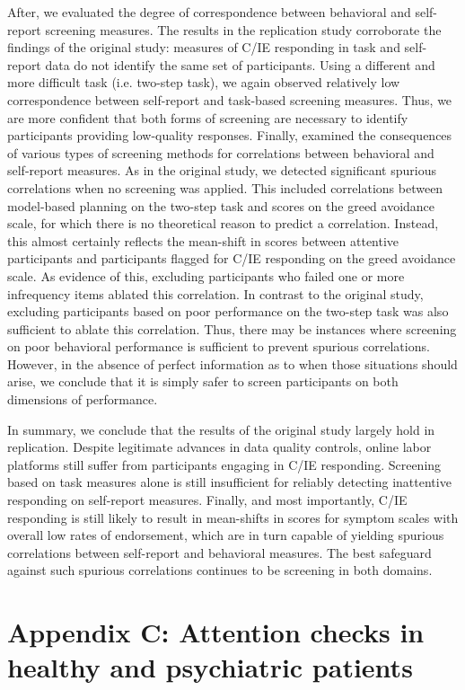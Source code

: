 \documentclass[a4paper,notitlepage,12pt]{article}
\begin{document}
\begin{refsection}[supp]
After, we evaluated the degree of correspondence between behavioral and self-report screening measures. The results in the replication study corroborate the findings of the original study: measures of C/IE responding in task and self-report data do not identify the same set of participants. Using a different and more difficult task (i.e. two-step task), we again observed relatively low correspondence between self-report and task-based screening measures. Thus, we are more confident that both forms of screening are necessary to identify participants providing low-quality responses. Finally, examined the consequences of various types of screening methods for correlations between behavioral and self-report measures. As in the original study, we detected significant spurious correlations when no screening was applied. This included correlations between model-based planning on the two-step task and scores on the greed avoidance scale, for which there is no theoretical reason to predict a correlation. Instead, this almost certainly reflects the mean-shift in scores between attentive participants and participants flagged for C/IE responding on the greed avoidance scale. As evidence of this, excluding participants who failed one or more infrequency items ablated this correlation. In contrast to the original study, excluding participants based on poor performance on the two-step task was also sufficient to ablate this correlation. Thus, there may be instances where screening on poor behavioral performance is sufficient to prevent spurious correlations. However, in the absence of perfect information as to when those situations should arise, we conclude that it is simply safer to screen participants on both dimensions of performance. 

In summary, we conclude that the results of the original study largely hold in replication. Despite legitimate advances in data quality controls, online labor platforms still suffer from participants engaging in C/IE responding. Screening based on task measures alone is still insufficient for reliably detecting inattentive responding on self-report measures. Finally, and most importantly, C/IE responding is still likely to result in mean-shifts in scores for symptom scales with overall low rates of endorsement, which are in turn capable of yielding spurious correlations between self-report and behavioral measures. The best safeguard against such spurious correlations continues to be screening in both domains. 

\break
\section*{Appendix C: Attention checks in healthy and psychiatric patients}


\end{refsection}
\end{document}
